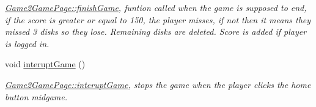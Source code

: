 \begin{DoxyCompactItemize}
\begin{DoxyCompactList}\small\item\em \hyperlink{classGame2GamePage_ac67671d38d267c23d6e58af95056d164}{Game2\+Game\+Page\+::finish\+Game}, funtion called when the game is supposed to end, if the score is greater or equal to 150, the player misses, if not then it means they missed 3 disks so they lose. Remaining disks are deleted. Score is added if player is logged in. \end{DoxyCompactList}\item 
\mbox{\label{classGame2GamePage_aac3cc717d7a5eac6ad8c8251c15774e9}} 
void \hyperlink{classGame2GamePage_aac3cc717d7a5eac6ad8c8251c15774e9}{interupt\+Game} ()
\begin{DoxyCompactList}\small\item\em \hyperlink{classGame2GamePage_aac3cc717d7a5eac6ad8c8251c15774e9}{Game2\+Game\+Page\+::interupt\+Game}, stops the game when the player clicks the home button midgame. \end{DoxyCompactList}\end{DoxyCompactItemize}
